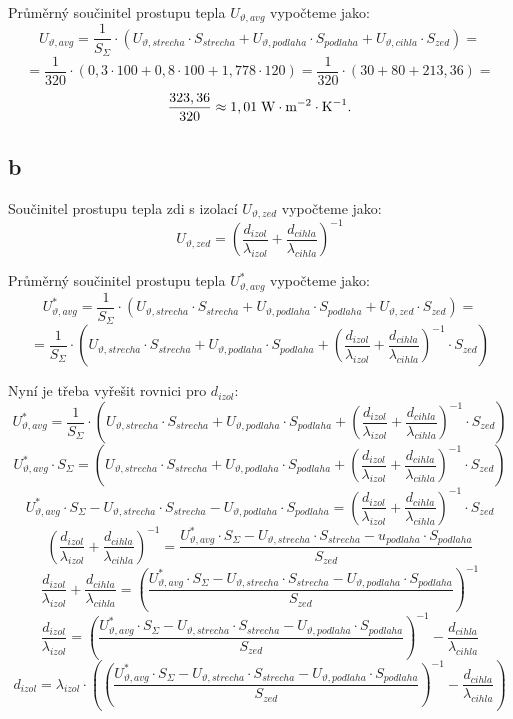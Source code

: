 \documentclass{article}
\begin{document}
Průměrný součinitel prostupu tepla $U_{\vartheta,avg}$ vypočteme jako:
$$
    U_{\vartheta,avg} = \frac{1}{S_{\Sigma}} \cdot (U_{\vartheta,strecha} \cdot S_{strecha} + U_{\vartheta,podlaha} \cdot S_{podlaha} + U_{\vartheta,cihla} \cdot S_{zed}) =
$$
$$
    = \frac{1}{320} \cdot \left( 0,3 \cdot 100 + 0,8 \cdot 100 + 1,778 \cdot 120 \right) = \frac{1}{320} \cdot (30 + 80 + 213,36) =
$$
$$
    \frac{323,36}{320} \approx 1,01 \; \textrm{W} \cdot \textrm{m}^{-2} \cdot \textrm{K}^{-1}.
$$



\subsection{b}
Součinitel prostupu tepla zdi s izolací $U_{\vartheta,zed}$ vypočteme jako:
$$
    U_{\vartheta,zed} = \left( \frac{d_{izol}}{\lambda_{izol}} + \frac{d_{cihla}}{\lambda_{cihla}} \right)^{-1}
$$

Průměrný součinitel prostupu tepla $U_{\vartheta,avg}^{*}$ vypočteme jako:
$$
    U_{\vartheta,avg}^{*} = \frac{1}{S_{\Sigma}} \cdot (U_{\vartheta,strecha} \cdot S_{strecha} + U_{\vartheta,podlaha} \cdot S_{podlaha} + U_{\vartheta,zed} \cdot S_{zed}) =
$$
$$
    = \frac{1}{S_{\Sigma}} \cdot (U_{\vartheta,strecha} \cdot S_{strecha} + U_{\vartheta,podlaha} \cdot S_{podlaha} + \left( \frac{d_{izol}}{\lambda_{izol}} + \frac{d_{cihla}}{\lambda_{cihla}} \right)^{-1} \cdot S_{zed})
$$

Nyní je třeba vyřešit rovnici pro $d_{izol}$:
$$
    U_{\vartheta,avg}^{*} = \frac{1}{S_{\Sigma}} \cdot (U_{\vartheta,strecha} \cdot S_{strecha} + U_{\vartheta,podlaha} \cdot S_{podlaha} + \left( \frac{d_{izol}}{\lambda_{izol}} + \frac{d_{cihla}}{\lambda_{cihla}} \right)^{-1} \cdot S_{zed})
$$
$$
    U_{\vartheta,avg}^{*} \cdot S_{\Sigma} =  (U_{\vartheta,strecha} \cdot S_{strecha} + U_{\vartheta,podlaha} \cdot S_{podlaha} + \left( \frac{d_{izol}}{\lambda_{izol}} + \frac{d_{cihla}}{\lambda_{cihla}} \right)^{-1} \cdot S_{zed})
$$
$$
    U_{\vartheta,avg}^{*} \cdot S_{\Sigma} - U_{\vartheta,strecha} \cdot S_{strecha} - U_{\vartheta,podlaha} \cdot S_{podlaha} = \left( \frac{d_{izol}}{\lambda_{izol}} + \frac{d_{cihla}}{\lambda_{cihla}} \right)^{-1} \cdot S_{zed}
$$
$$
    \left( \frac{d_{izol}}{\lambda_{izol}} + \frac{d_{cihla}}{\lambda_{cihla}} \right)^{-1} = \frac{U_{\vartheta,avg}^{*} \cdot S_{\Sigma} - U_{\vartheta,strecha} \cdot S_{strecha} - u_{podlaha} \cdot S_{podlaha}}{S_{zed}}
$$
$$
    \frac{d_{izol}}{\lambda_{izol}} + \frac{d_{cihla}}{\lambda_{cihla}} = \left( \frac{U_{\vartheta,avg}^{*} \cdot S_{\Sigma} - U_{\vartheta,strecha} \cdot S_{strecha} - U_{\vartheta,podlaha} \cdot S_{podlaha}}{S_{zed}} \right)^{-1}
$$
$$
    \frac{d_{izol}}{\lambda_{izol}} = \left( \frac{U_{\vartheta,avg}^{*} \cdot S_{\Sigma} - U_{\vartheta,strecha} \cdot S_{strecha} - U_{\vartheta,podlaha} \cdot S_{podlaha}}{S_{zed}} \right)^{-1} - \frac{d_{cihla}}{\lambda_{cihla}}
$$
$$
    d_{izol} = \lambda_{izol} \cdot \left( \left( \frac{U_{\vartheta,avg}^{*} \cdot S_{\Sigma} - U_{\vartheta,strecha} \cdot S_{strecha} - U_{\vartheta,podlaha} \cdot S_{podlaha}}{S_{zed}} \right)^{-1} - \frac{d_{cihla}}{\lambda_{cihla}} \right)
$$
\end{document}

